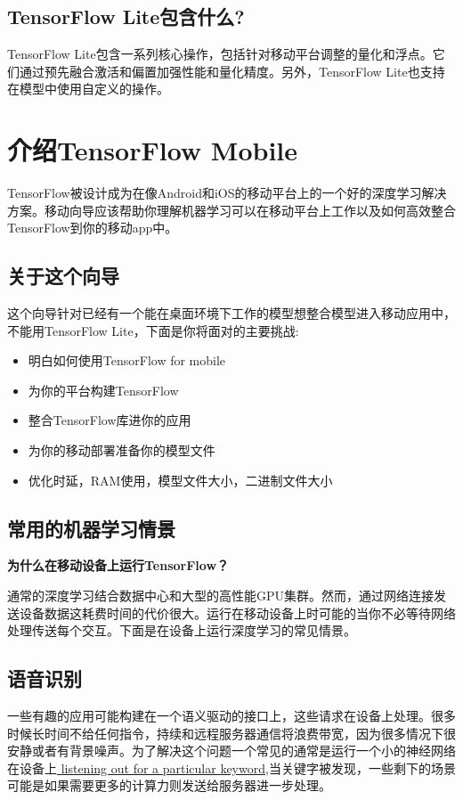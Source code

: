 \subsection{TensorFlow Lite包含什么?}
TensorFlow Lite包含一系列核心操作，包括针对移动平台调整的量化和浮点。它们通过预先融合激活和偏置加强性能和量化精度。另外，TensorFlow Lite也支持在模型中使用自定义的操作。
\section{介绍TensorFlow Mobile}
TensorFlow被设计成为在像Android和iOS的移动平台上的一个好的深度学习解决方案。移动向导应该帮助你理解机器学习可以在移动平台上工作以及如何高效整合TensorFlow到你的移动app中。
\subsection{关于这个向导}
这个向导针对已经有一个能在桌面环境下工作的模型想整合模型进入移动应用中，不能用TensorFlow Lite，下面是你将面对的主要挑战:
\begin{itemize}
    \item 明白如何使用TensorFlow for mobile 
    \item 为你的平台构建TensorFlow
    \item 整合TensorFlow库进你的应用
    \item 为你的移动部署准备你的模型文件
    \item 优化时延，RAM使用，模型文件大小，二进制文件大小
\end{itemize}
\subsection{常用的机器学习情景}
\textbf{为什么在移动设备上运行TensorFlow？}

通常的深度学习结合数据中心和大型的高性能GPU集群。然而，通过网络连接发送设备数据这耗费时间的代价很大。运行在移动设备上时可能的当你不必等待网络处理传送每个交互。下面是在设备上运行深度学习的常见情景。
\subsection{语音识别}
一些有趣的应用可能构建在一个语义驱动的接口上，这些请求在设备上处理。很多时候长时间不给任何指令，持续和远程服务器通信将浪费带宽，因为很多情况下很安静或者有背景噪声。为了解决这个问题一个常见的通常是运行一个小的神经网络在设备上\href{https://www.tensorflow.org/tutorials/audio_recognition?hl=zh-cn}{ listening out for a particular keyword},当关键字被发现，一些剩下的场景可能是如果需要更多的计算力则发送给服务器进一步处理。
